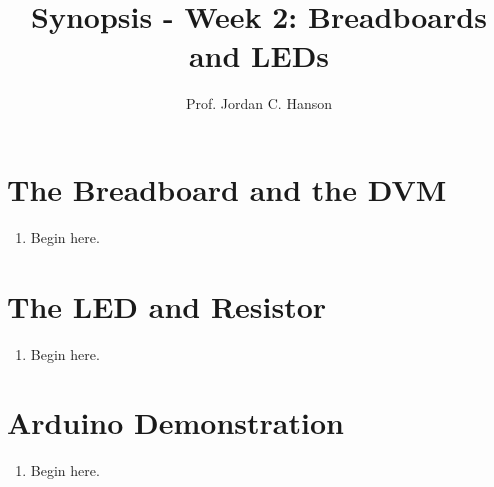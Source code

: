 \documentclass{article}
\begin{document}
\title{Synopsis - Week 2: Breadboards and LEDs}
\author{Prof. Jordan C. Hanson}

\maketitle

\section{The Breadboard and the DVM}

\begin{enumerate}
\item Begin here.
\end{enumerate}

\section{The LED and Resistor}

\begin{enumerate}
\item Begin here.
\end{enumerate}

\section{Arduino Demonstration}

\begin{enumerate}
\item Begin here.
\end{enumerate}
\end{document}
